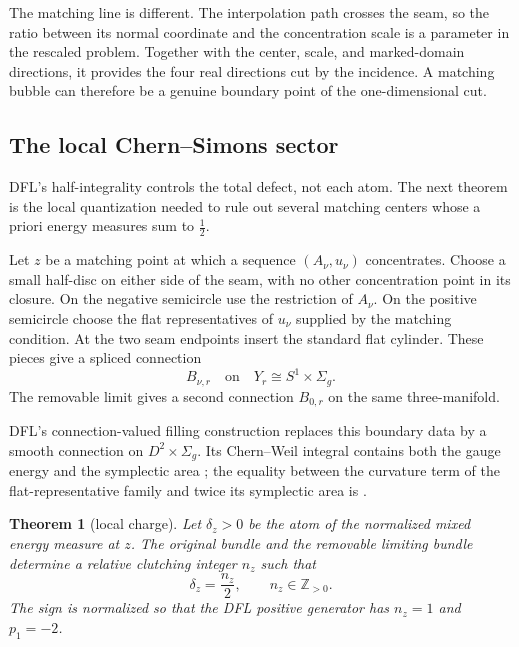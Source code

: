 \documentclass[11pt]{amsart}
\newtheorem{theorem}{Theorem}[section]
\theoremstyle{definition}
\theoremstyle{remark}
\theoremstyle{plain}
\newcommand{\ZZ}{\mathbb{Z}}
\begin{document}
The matching line is different.  The interpolation path crosses the seam,
so the ratio between its normal coordinate and the concentration scale is
a parameter in the rescaled problem.  Together with the center, scale,
and marked-domain directions, it provides the four real directions cut by
the incidence.  A matching bubble can therefore be a genuine boundary
point of the one-dimensional cut.

\subsection{The local Chern--Simons sector}\label{sec:local-CS}
DFL's half-integrality controls the total defect, not each atom.  The next
theorem is the local quantization needed to rule out several matching
centers whose a priori energy measures sum to $\frac12$.

Let $z$ be a matching point at which a sequence $(A_\nu,u_\nu)$
concentrates.  Choose a small half-disc on either side of the seam, with
no other concentration point in its closure.  On the negative semicircle
use the restriction of $A_\nu$.  On the positive semicircle choose the
flat representatives of $u_\nu$ supplied by the matching condition.  At
the two seam endpoints insert the standard flat cylinder.  These pieces
give a spliced connection
\[
                       B_{\nu,r}\quad\text{on}\quad
                       Y_r\cong S^1\times\Sigma_g.
\]
The removable limit gives a second connection $B_{0,r}$ on the same
three-manifold.

DFL's connection-valued filling construction replaces this boundary data
by a smooth connection on $D^2\times\Sigma_g$.  Its Chern--Weil integral
contains both the gauge energy and the symplectic area
\cite[Lemma~4.67]{DaeFukLip21b}; the equality between the curvature term of
the flat-representative family and twice its symplectic area is
\cite[Lemma~5.10]{DaeFukLip21a}.

\begin{theorem}[local charge]\label{thm:local-charge}
Let $\delta_z>0$ be the atom of the normalized mixed energy measure at
$z$.  The original bundle and the removable limiting bundle determine a
relative clutching integer $n_z$ such that
\begin{equation}\label{eq:local-charge}
                        \delta_z=\frac{n_z}{2},
                 \qquad n_z\in\ZZ_{>0}.
\end{equation}
The sign is normalized so that the DFL positive generator has $n_z=1$ and
$p_1=-2$.
\end{theorem}
\end{document}
